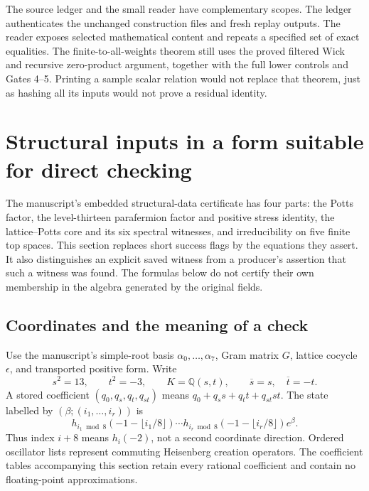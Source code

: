 The source ledger and the small reader have complementary scopes.
The ledger authenticates the unchanged construction files and
fresh replay outputs.  The reader exposes selected mathematical
content and repeats a specified set of exact equalities.  The
finite-to-all-weights theorem still uses the proved filtered Wick
and recursive zero-product argument, together with the full lower
controls and Gates 4--5.  Printing a sample scalar relation would
not replace that theorem, just as hashing all its inputs would
not prove a residual identity.

\section{Structural inputs in a form suitable for direct checking}
\label{hr:structural-inputs}

The manuscript's embedded structural-data certificate has four parts:
the Potts factor, the level-thirteen parafermion factor and positive
stress identity, the lattice--Potts core and its six spectral witnesses,
and irreducibility on five finite top spaces. This section replaces
short success flags by the equations they assert. It also distinguishes
an explicit saved witness from a producer's assertion that such a
witness was found. The formulas below do not certify their own
membership in the algebra generated by the original fields.

\subsection{Coordinates and the meaning of a check}

Use the manuscript's simple-root basis $\alpha_0,\ldots,\alpha_7$,
Gram matrix $G$, lattice cocycle $\epsilon$, and transported positive
form. Write
\[
 s^2=13,\qquad t^2=-3,\qquad
 K=\mathbb Q(s,t),\qquad
 \overline{s}=s,\quad\overline{t}=-t.
\]
A stored coefficient $(q_0,q_s,q_t,q_{st})$ means
$q_0+q_ss+q_tt+q_{st}st$. The state labelled by
$(\beta;(i_1,\ldots,i_r))$ is
\[
 h_{i_1\bmod8}(-1-\lfloor i_1/8\rfloor)\cdots
 h_{i_r\bmod8}(-1-\lfloor i_r/8\rfloor)e^\beta.
\]
Thus index $i+8$ means $h_i(-2)$, not a second coordinate
direction. Ordered oscillator lists represent commuting Heisenberg
creation operators. The coefficient tables accompanying this section
retain every rational coefficient and contain no floating-point
approximations.

